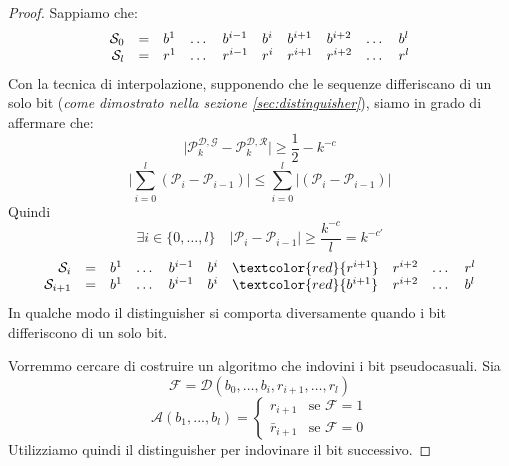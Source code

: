 \begin{proof}
  Sappiamo che:
  \begin{align*}
    \begin{array}{r c lllllllll}
    \mathcal{S}_0 & = & b^1 &\dots &b^{i-1} & b^i &b^{i+1} & b^{i+2} &\dots &b^l \\
    \mathcal{S}_{l}& = & r^1 &\dots &r^{i-1} & r^i &r^{i+1} & r^{i+2} &\dots &r^l \\
    \end{array}
  \end{align*}
  Con la tecnica di 
  interpolazione, supponendo che le sequenze differiscano di un solo bit 
  (\textit{come dimostrato nella sezione \ref{sec:distinguisher}}), siamo 
  in grado di affermare che:
  \[
    \bigg| \mathcal{P}_k^{\mathcal{D},\mathcal{G}} - \mathcal{P}_k^{\mathcal{D},\mathcal{R}} \bigg| \geq \frac{1}{2} - k^{-c}
  \]
  \[
    \bigg| \sum_{i = 0}^{l}(\mathcal{P}_i - \mathcal{P}_{i - 1}) \bigg| \leq \sum_{i = 0}^{l} \bigg| (\mathcal{P}_i - \mathcal{P}_{i - 1}) \bigg|
  \]
  Quindi
  \[
    \exists i \in \{0, \dots, l\} \quad \bigg| \mathcal{P}_i - \mathcal{P}_{i - 1} \bigg| \geq \frac{k^{-c}}{l} = k^{-c'}
  \]
  \begin{align*}
    \begin{array}{r c lllllllll}
    \mathcal{S}_i & = & b^1 &\dots &b^{i-1} & b^i &\textcolor{red}{r^{i+1}} & r^{i+2} &\dots &r^l \\
    \mathcal{S}_{i+1}& = & b^1 &\dots &b^{i-1} & b^i &\textcolor{red}{b^{i+1}} & r^{i+2} &\dots &b^l \\
    \end{array}
  \end{align*}
  In qualche modo il distinguisher si comporta diversamente quando i bit differiscono di un solo bit.

  Vorremmo cercare di costruire un algoritmo che indovini i bit pseudocasuali.
  Sia
  \[
    \mathcal{F} = \mathcal{D}(b_0, \dots, b_{i}, r_{i+1}, \dots, r_l)
  \]
  \[
    \mathcal{A}(b_1,...,b_l) = 
    \begin{cases}
      r_{i+1} & \text{se } \mathcal{F} = 1 \\
      \bar{r}_{i+1} & \text{se } \mathcal{F} = 0
    \end{cases}
  \]
  Utilizziamo quindi il distinguisher per indovinare il bit successivo.


\end{proof}
